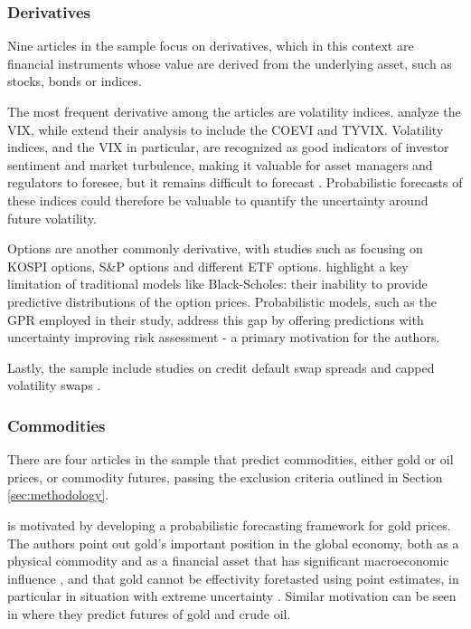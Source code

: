 \subsubsection{Derivatives}
Nine articles in the sample focus on derivatives, which in this context are financial instruments whose value are derived from the underlying asset, such as stocks, bonds or indices.

The most frequent derivative among the articles are volatility indices. \textcite{hortua2024forecasting, Daniali2021} analyze the VIX, while \textcite{Tian2023} extend their analysis to include the COEVI and TYVIX. Volatility indices, and the VIX in particular, are recognized as good indicators of investor sentiment and market turbulence, making it valuable for asset managers and regulators to foresee, but it remains difficult to forecast \parencite{hortua2024forecasting}. Probabilistic forecasts  of these indices could therefore be valuable to quantify the uncertainty around future volatility.

Options are another commonly derivative, with studies such as \textcite{Park2014gpr} focusing on KOSPI options, \textcite{DeSpiegeleer2018gpr} S\&P options and \textcite{tang2024period} different ETF options. \textcite{Park2014gpr} highlight a key limitation of traditional models like Black-Scholes: their inability to provide predictive distributions of the option prices. Probabilistic models, such as the GPR employed in their study, address this gap by offering predictions with uncertainty improving risk assessment - a primary motivation for the authors. 

Lastly, the sample include studies on credit default swap spreads \parencite{Law2017Practical} and capped volatility swaps \parencite{Hocht2024gpr}. 


\subsubsection{Commodities}
There are four articles in the sample that predict commodities, either gold or oil prices, or commodity futures, passing the exclusion criteria outlined in Section \ref{sec:methodology}. 

\textcite{Wang2024GoldForecasting} is motivated by developing a probabilistic forecasting framework for gold prices. The authors point out gold's important position in the global economy, both as a physical commodity and as a financial asset that has significant macroeconomic influence \parencite{Wang2024GoldForecasting, Pierdzioch2014Efficiency, Pierdzioch2014International}, and that gold cannot be effectivity foretasted using point estimates, in particular in situation with extreme uncertainty \parencite{Wang2024GoldForecasting, Li2012Quantile}. Similar motivation can be seen in \textcite{Law2017Practical} where they predict futures of gold and crude oil.  

